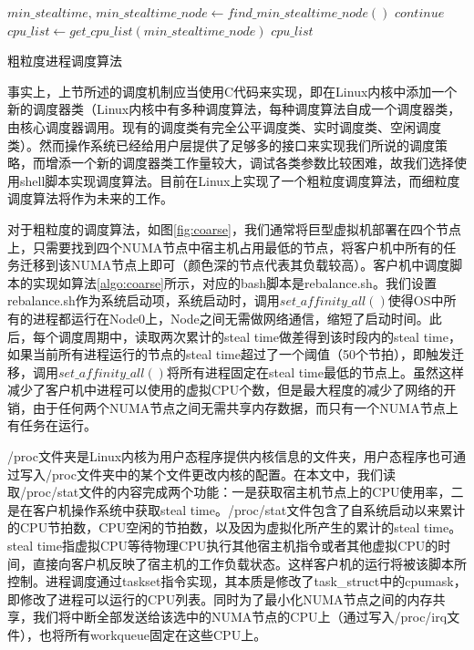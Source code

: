 \begin{algorithm}[h]
\begin{algorithmic}[ruled,1]
\State
{}
\State
{}
\State
{}
\EndFor
\EndFunction
\State
\State
{}
\State
{}
\State
{}
\State $min\_stealtime,\,min\_stealtime\_node \gets find\_min\_stealtime\_node()$
\State $continue$
\EndIf
\State $cpu\_list \gets get\_cpu\_list(min\_stealtime\_node)$
\State
{} {$cpu\_list$}
\EndWhile
\end{algorithmic}
\caption{粗粒度进程调度算法}
\label{algo:coarse}
\end{algorithm}
事实上，上节所述的调度机制应当使用C代码来实现，即在Linux内核中添加一个新的调度器类（Linux内核中有多种调度算法，每种调度算法自成一个调度器类，由核心调度器调用。现有的调度类有完全公平调度类、实时调度类、空闲调度类）。然而操作系统已经给用户层提供了足够多的接口来实现我们所说的调度策略，而增添一个新的调度器类工作量较大，调试各类参数比较困难，故我们选择使用shell脚本实现调度算法。目前在Linux上实现了一个粗粒度调度算法，而细粒度调度算法将作为未来的工作。

对于粗粒度的调度算法，如图\ref{fig:coarse}，我们通常将巨型虚拟机部署在四个节点上，只需要找到四个NUMA节点中宿主机占用最低的节点，将客户机中所有的任务迁移到该NUMA节点上即可（颜色深的节点代表其负载较高）。客户机中调度脚本的实现如算法\ref{algo:coarse}所示，对应的bash脚本是rebalance.sh。我们设置rebalance.sh作为系统启动项，系统启动时，调用$set\_affinity\_all()$使得OS中所有的进程都运行在Node0上，Node之间无需做网络通信，缩短了启动时间。此后，每个调度周期中，读取两次累计的steal time做差得到该时段内的steal time，如果当前所有进程运行的节点的steal time超过了一个阈值（50个节拍），即触发迁移，调用$set\_affinity\_all()$将所有进程固定在steal time最低的节点上。虽然这样减少了客户机中进程可以使用的虚拟CPU个数，但是最大程度的减少了网络的开销，由于任何两个NUMA节点之间无需共享内存数据，而只有一个NUMA节点上有任务在运行。

/proc文件夹是Linux内核为用户态程序提供内核信息的文件夹，用户态程序也可通过写入/proc文件夹中的某个文件更改内核的配置。在本文中，我们读取/proc/stat文件的内容完成两个功能：一是获取宿主机节点上的CPU使用率，二是在客户机操作系统中获取steal time。/proc/stat文件包含了自系统启动以来累计的CPU节拍数，CPU空闲的节拍数，以及因为虚拟化所产生的累计的steal time。steal time指虚拟CPU等待物理CPU执行其他宿主机指令或者其他虚拟CPU的时间，直接向客户机反映了宿主机的工作负载状态。这样客户机的运行将被该脚本所控制。进程调度通过taskset指令实现，其本质是修改了task\_struct中的cpumask，即修改了进程可以运行的CPU列表。同时为了最小化NUMA节点之间的内存共享，我们将中断全部发送给该选中的NUMA节点的CPU上（通过写入/proc/irq文件），也将所有workqueue固定在这些CPU上。

